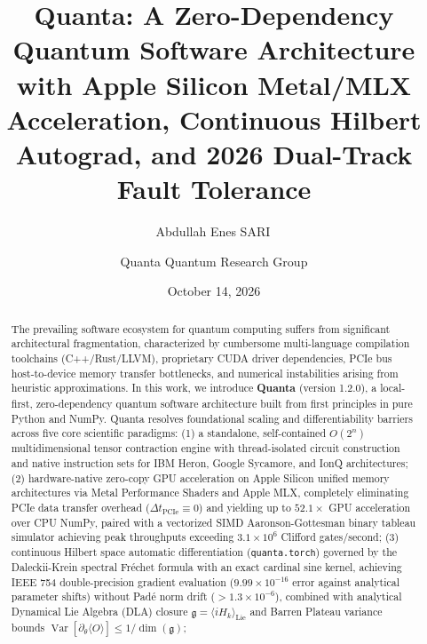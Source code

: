 \documentclass[aps,prx,twocolumn,superscriptaddress,nofootinbib]{revtex4-2}
\newcommand{\Var}{\operatorname{Var}}
\begin{document}
\title{Quanta: A Zero-Dependency Quantum Software Architecture with Apple Silicon Metal/MLX Acceleration, Continuous Hilbert Autograd, and 2026 Dual-Track Fault Tolerance}

\author{Abdullah Enes SARI\,}

\author{Quanta Quantum Research Group}

\date{October 14, 2026}

\begin{abstract}
The prevailing software ecosystem for quantum computing suffers from significant architectural fragmentation, characterized by cumbersome multi-language compilation toolchains (C++/Rust/LLVM), proprietary CUDA driver dependencies, PCIe bus host-to-device memory transfer bottlenecks, and numerical instabilities arising from heuristic approximations. In this work, we introduce \textbf{Quanta} (version 1.2.0), a local-first, zero-dependency quantum software architecture built from first principles in pure Python and NumPy. Quanta resolves foundational scaling and differentiability barriers across five core scientific paradigms:
(1) a standalone, self-contained $O(2^n)$ multidimensional tensor contraction engine with thread-isolated circuit construction and native instruction sets for IBM Heron, Google Sycamore, and IonQ architectures;
(2) hardware-native zero-copy GPU acceleration on Apple Silicon unified memory architectures via Metal Performance Shaders and Apple MLX, completely eliminating PCIe data transfer overhead ($\Delta t_{\text{PCIe}} \equiv 0$) and yielding up to $52.1\times$ GPU acceleration over CPU NumPy, paired with a vectorized SIMD Aaronson-Gottesman binary tableau simulator achieving peak throughputs exceeding $3.1 \times 10^6$ Clifford gates/second;
(3) continuous Hilbert space automatic differentiation (\texttt{quanta.torch}) governed by the Daleckii-Krein spectral Fr\'echet formula with an exact cardinal sine kernel, achieving IEEE 754 double-precision gradient evaluation ($9.99 \times 10^{-16}$ error against analytical parameter shifts) without Pad\'e norm drift ($>1.3 \times 10^{-6}$), combined with analytical Dynamical Lie Algebra (DLA) closure $\mathfrak{g} = \langle i H_k \rangle_{\text{Lie}}$ and Barren Plateau variance bounds $\Var[\partial_\theta \langle O \rangle] \le 1/\dim(\mathfrak{g})$;

\end{abstract}
\end{document}
